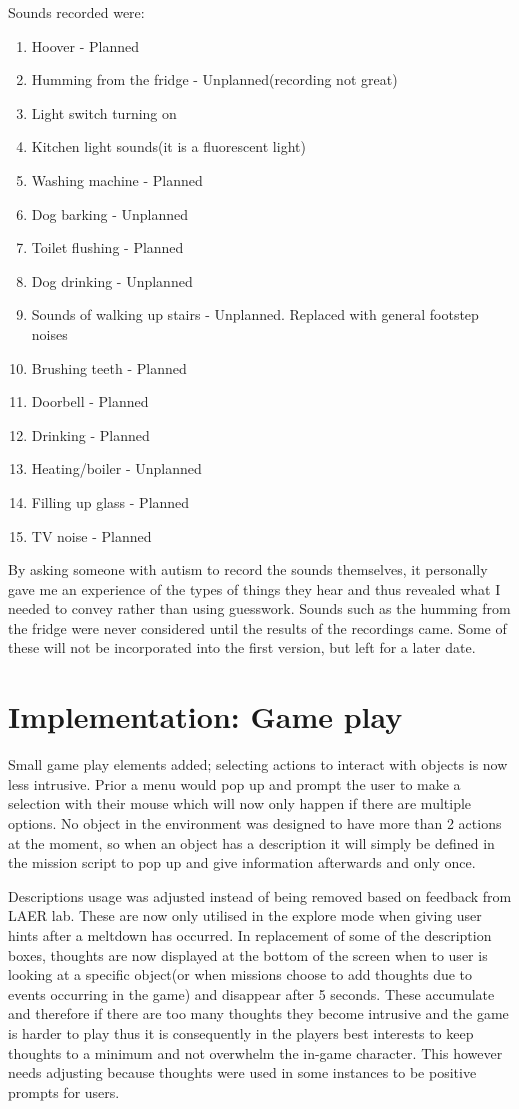 \documentclass[11pt]{report}
\begin{document}
Sounds recorded were:

\begin{enumerate}
\item Hoover - Planned
\item Humming from the fridge - Unplanned(recording not great)
\item Light switch turning on
\item Kitchen light sounds(it is a fluorescent light)
\item Washing machine - Planned
\item Dog barking - Unplanned
\item Toilet flushing - Planned
\item Dog drinking - Unplanned
\item Sounds of walking up stairs - Unplanned. Replaced with general footstep noises
\item Brushing teeth - Planned
\item Doorbell - Planned
\item Drinking - Planned
\item Heating/boiler - Unplanned
\item Filling up glass - Planned
\item TV noise - Planned
\end{enumerate}

By asking someone with autism to record the sounds themselves, it personally gave me an experience of the types of things they hear and thus revealed what I needed to convey rather than using guesswork. Sounds such as the humming from the fridge were never considered until the results of the recordings came. Some of these will not be incorporated into the first version, but left for a later date. 

\section{Implementation: Game play}

Small game play elements added; selecting actions to interact with objects is now less intrusive. Prior a menu would pop up and prompt the user to make a selection with their mouse which will now only happen if there are multiple options. No object in the environment was designed to have more than 2 actions at the moment, so when an object has a description it will simply be defined in the mission script to pop up and give information afterwards and only once. 

Descriptions usage was adjusted instead of being removed based on feedback from LAER lab. These are now only utilised in the explore mode when giving user hints after a meltdown has occurred. In replacement of some of the description boxes, thoughts are now displayed at the bottom of the screen when to user is looking at a specific object(or when missions choose to add thoughts due to events occurring in the game) and disappear after 5 seconds. These accumulate and therefore if there are too many thoughts they become intrusive and the game is harder to play thus it is consequently in the players best interests to keep thoughts to a minimum and not overwhelm the in-game character. This however needs adjusting because thoughts were used in some instances to be positive prompts for users.
\end{document}
